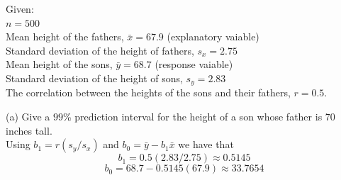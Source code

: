 \documentclass[boxes, qed]{homework}
\begin{document}
\begin{problem}Given:\\
  $n=500$\\
  Mean height of the fathers, $\bar{x}=67.9$ (explanatory vaiable)\\
  Standard deviation of the height of fathers, $s_x=2.75$\\
  Mean height of the sons, $\bar{y}=68.7$ (response vaiable)\\
  Standard deviation of the height of sons, $s_y=2.83$\\
  The correlation between the heights of the sons and their fathers, $r=0.5$.
\end{problem}
\begin{solution}
  (a) Give a $99$\% prediction interval for the height of a son whose father is $70$ inches tall.\\
  Using $b_1=r(s_y/s_x)$ and $b_0=\bar{y}-b_1\bar{x}$ we have that
  $$b_1=0.5(2.83/2.75)\approx 0.5145$$
  $$b_0=68.7 - 0.5145(67.9) \approx 33.7654$$
\end{solution}
\end{document}
